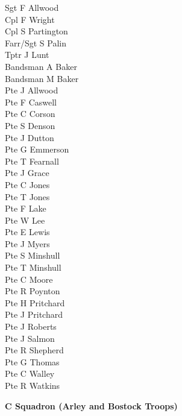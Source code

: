 \begin{multicols}{2}
  Sgt F Allwood \\
  Cpl F Wright \\
  Cpl S Partington \\
  Farr/Sgt S Palin \\
  Tptr J Lunt \\
  Bandsman A Baker \\
  Bandsman M Baker \\
  Pte J Allwood \\
  Pte F Caswell \\
  Pte C Corson \\
  Pte S Denson \\
  Pte J Dutton \\
  Pte G Emmerson \\
  Pte T Fearnall \\
  Pte J Grace \\
  Pte C Jones \\
  Pte T Jones \\
  Pte F Lake \\
  Pte W Lee \\
  Pte E Lewis \\
  Pte J Myers \\
  Pte S Minshull \\
  Pte T Minshull \\
  Pte C Moore \\
  Pte R Poynton \\
  Pte H Pritchard \\
  Pte J Pritchard \\
  Pte J Roberts \\
  Pte J Salmon \\
  Pte R Shepherd \\
  Pte G Thomas \\
  Pte C Walley \\
  Pte R Watkins \\
\end{multicols}

\begin{center}
  \Large
  \textbf{C Squadron (Arley and Bostock Troops)}
\end{center}

